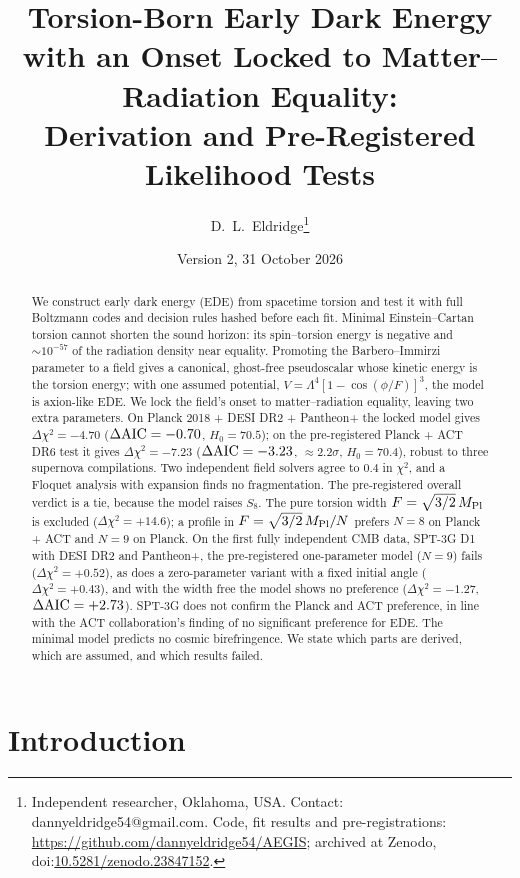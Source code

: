 \documentclass[11pt]{article}
\title{\textbf{Torsion-Born Early Dark Energy\\ with an Onset Locked to Matter--Radiation Equality:\\
Derivation and Pre-Registered Likelihood Tests}}
\author{D.~L.~Eldridge\thanks{Independent researcher, Oklahoma, USA. Contact: dannyeldridge54@gmail.com.
Code, fit results and pre-registrations: \url{https://github.com/dannyeldridge54/AEGIS}; archived at Zenodo, doi:\href{https://doi.org/10.5281/zenodo.23847152}{10.5281/zenodo.23847152}.}}
\date{Version 2, 31 October 2026}
\newcommand{\Mp}{M_{\rm Pl}}
\begin{document}
\maketitle

\begin{abstract}
We construct early dark energy (EDE) from spacetime torsion and test it with full Boltzmann
codes and decision rules hashed before each fit. Minimal Einstein--Cartan torsion cannot shorten
the sound horizon: its spin--torsion energy is negative and $\sim10^{-57}$ of the radiation
density near equality. Promoting the Barbero--Immirzi parameter to a field gives a canonical,
ghost-free pseudoscalar whose kinetic energy is the torsion energy; with one assumed potential,
$V=\Lambda^4[1-\cos(\phi/F)]^3$, the model is axion-like EDE. We lock the field's onset to
matter--radiation equality, leaving two extra parameters. On Planck 2018 + DESI DR2 + Pantheon+
the locked model gives $\Delta\chi^2=-4.70$ ($\Delta{\rm AIC}=-0.70$, $H_0=70.5$); on the
pre-registered Planck + ACT DR6 test it gives $\Delta\chi^2=-7.23$ ($\Delta{\rm AIC}=-3.23$,
$\approx2.2\sigma$, $H_0=70.4$), robust to three supernova compilations. Two independent field
solvers agree to $0.4$ in $\chi^2$, and a Floquet analysis with expansion finds no fragmentation.
The pre-registered overall verdict is a tie, because the model raises $S_8$. The pure torsion
width $F=\sqrt{3/2}\,\Mp$ is excluded ($\Delta\chi^2=+14.6$); a profile in $F=\sqrt{3/2}\,\Mp/N$
prefers $N=8$ on Planck + ACT and $N=9$ on Planck. On the first fully independent CMB data,
SPT-3G D1 with DESI DR2 and Pantheon+, the pre-registered one-parameter model ($N=9$) fails
($\Delta\chi^2=+0.52$), as does a zero-parameter variant with a fixed initial angle
($\Delta\chi^2=+0.43$), and with the width free the model shows no preference
($\Delta\chi^2=-1.27$, $\Delta{\rm AIC}=+2.73$). SPT-3G does not confirm the Planck and ACT
preference, in line with the ACT collaboration's finding of no significant preference for EDE. The minimal model predicts no cosmic birefringence. We state
which parts are derived, which are assumed, and which results failed.
\end{abstract}

\tableofcontents

\section{Introduction}\label{sec:intro}
\end{document}
